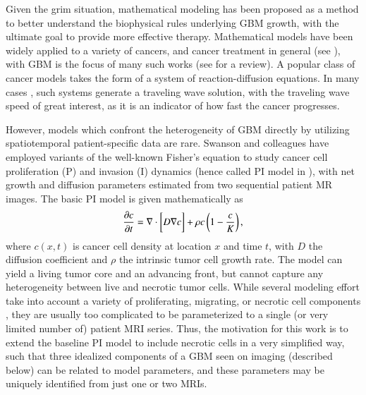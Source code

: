 \documentclass{aims}
\numberwithin{equation}{section}
\begin{document}
Given the grim situation, mathematical modeling has been proposed as a method to better understand the biophysical rules underlying GBM growth, with the ultimate goal to provide more effective therapy.  Mathematical models have been widely applied to a variety of cancers, and cancer treatment in general (see \cite{Kuang}), with GBM is the focus of many such works (see \cite{Martirosyan2015} for a review).  A popular class of cancer models takes the form of a system of reaction-diffusion equations. In many cases \cite{Harley2014,Gerlee2016,Stepien2018}, such systems generate a traveling wave solution, with the traveling wave speed of great interest, as it is an indicator of how fast the cancer progresses.

However, models which confront the heterogeneity of GBM directly by utilizing spatiotemporal patient-specific data are rare. Swanson and colleagues \cite{Swanson2008,Neal2013,Jackson2015a} have employed variants of the well-known Fisher's equation to study cancer cell proliferation (P) and invasion (I) dynamics \cite{FISHER1937} (hence called PI model in \cite{Jackson2015a}), with net growth and diffusion parameters estimated from two sequential patient MR images.  The basic PI model is given mathematically as
\begin{equation}
\frac{\partial c}{\partial t} = \nabla\cdot\bigg[D \nabla{c}\bigg] + \rho c \left(1 - \frac{c}{K}\right),
\end{equation}
where $c(x,t)$ is cancer cell density at location $x$ and time $t$, with $D$ the diffusion coefficient and $\rho$ the intrinsic tumor cell growth rate.  The model can yield a living tumor core and an advancing front, but cannot capture any heterogeneity between live and necrotic tumor cells.  While several modeling effort take into account a variety of proliferating, migrating, or necrotic cell components \cite{Eikenberry2009,Swanson2011}, they are usually too complicated to be parameterized to a single (or very limited number of) patient MRI series.  Thus, the motivation for this work is to extend the baseline PI model to include necrotic cells in a very simplified way, such that three idealized components of a GBM seen on imaging (described below) can be related to model parameters, and these parameters may be uniquely identified from just one or two MRIs.
\end{document}
